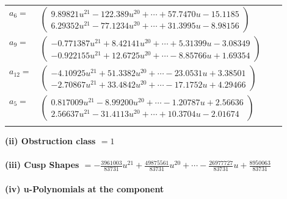 \documentclass[1p]{elsarticle_modified}
\theoremstyle{definition}
\begin{document}
\begin{tabular}{m{7pt} m{180pt} m{7pt} m{180pt} }
\flushright $a_{6}=$&$\begin{pmatrix}9.89821 u^{21}-122.389 u^{20}+\cdots+57.7470 u-15.1185\\6.29352 u^{21}-77.1234 u^{20}+\cdots+31.3995 u-8.98156\end{pmatrix}$ \\
\flushright $a_{9}=$&$\begin{pmatrix}-0.771387 u^{21}+8.42141 u^{20}+\cdots+5.31399 u-3.08349\\-0.922155 u^{21}+12.6725 u^{20}+\cdots-8.85766 u+1.69354\end{pmatrix}$ \\
\flushright $a_{12}=$&$\begin{pmatrix}-4.10925 u^{21}+51.3382 u^{20}+\cdots-23.0531 u+3.38501\\-2.70867 u^{21}+33.4842 u^{20}+\cdots-17.1752 u+4.29466\end{pmatrix}$ \\
\flushright $a_{5}=$&$\begin{pmatrix}0.817009 u^{21}-8.99200 u^{20}+\cdots-1.20787 u+2.56636\\2.56637 u^{21}-31.4113 u^{20}+\cdots+10.3704 u-2.01674\end{pmatrix}$\\&\end{tabular}
\flushleft \textbf{(ii) Obstruction class $= 1$}\\~\\
\flushleft \textbf{(iii) Cusp Shapes $= -\frac{3961003}{83731} u^{21}+\frac{49875561}{83731} u^{20}+\cdots-\frac{26977727}{83731} u+\frac{8950063}{83731}$}\\~\\
\newpage\renewcommand{\arraystretch}{1}
\flushleft \textbf{(iv) u-Polynomials at the component}\newline \\
\end{document}
